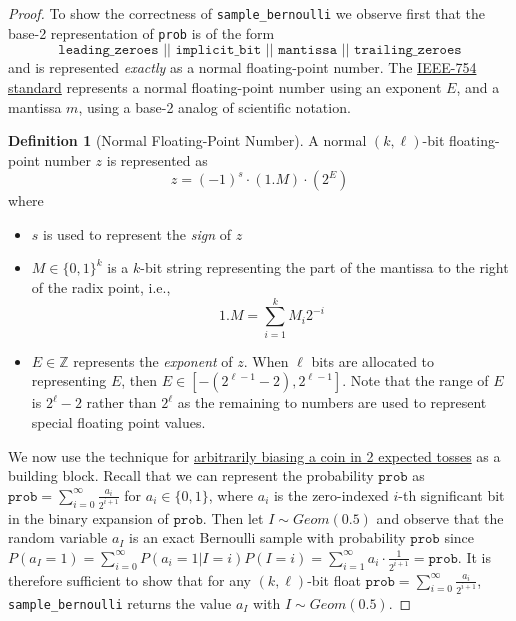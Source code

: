 \documentclass[11pt,a4paper]{article}
\theoremstyle{definition}
\newtheorem{definition}{Definition}
\begin{document}
\begin{proof} To show the correctness of \texttt{sample\_bernoulli} we observe first that the base-2 representation of \texttt{prob} is of the form 
\[
\texttt{leading\_zeroes || implicit\_bit || mantissa || trailing\_zeroes}
\]
and is represented \emph{exactly} as a normal floating-point number. The \href{https://en.wikipedia.org/wiki/IEEE_754}{IEEE-754 standard} represents a normal floating-point number using an exponent $E$, and a mantissa $m$, using a base-2 analog of scientific notation. 

\begin{definition}[Normal Floating-Point Number]
A normal $(k,\ell)$-bit floating-point number $z$ is represented as
\[
z = (-1)^s \cdot (1.M) \cdot (2^E) 
\]
where
\begin{itemize}
    \item $s$ is used to represent the \emph{sign} of $z$
    \item $M \in \{0,1\}^k$ is a $k$-bit string representing the part of the mantissa to the right of the radix point, i.e.,
    \[
    1.M = \sum_{i = 1}^k M_i2^{-i}
    \]
    \item $E \in \mathbb{Z}$ represents the \emph{exponent} of $z$. When $\ell$ bits are allocated to representing $E$, then $E \in [-(2^{\ell - 1} - 2), 2^{\ell - 1}]$. Note that the range of $E$ is $2^\ell - 2$ rather than $2^\ell$ as the remaining to numbers are used to represent special floating point values.
\end{itemize} 
\end{definition}

We now use the technique for \href{https://web.archive.org/web/20160418185834/https://amakelov.wordpress.com/2013/10/10/arbitrarily-biasing-a-coin-in-2-expected-tosses/}{arbitrarily biasing a coin in 2 expected tosses} as a building block. Recall that we can represent the probability $\texttt{prob}$ as $\texttt{prob} = \sum_{i = 0}^\infty \frac{a_i}{2^{i + 1}}$ for $a_i \in \{0, 1\}$, where $a_i$ is the zero-indexed $i$-th significant bit in the binary expansion of $\texttt{prob}$. Then let $I \sim Geom(0.5)$ and observe that the random variable $a_I$ is an exact Bernoulli sample with probability $\texttt{prob}$ since $P(a_I = 1) = \sum_{i = 0}^\infty P(a_i = 1|I = i)P(I = i) = \sum_{i = 1}^\infty a_i \cdot \frac{1}{2^{i + 1}} = \texttt{prob}$. It is therefore sufficient to show that for any $(k,\ell)$-bit float $\texttt{prob} = \sum_{i = 0}^\infty \frac{a_i}{2^{i + 1}}$, \texttt{sample\_bernoulli} returns the value $a_I$ with $I \sim Geom(0.5)$.


\end{proof}
\end{document}
